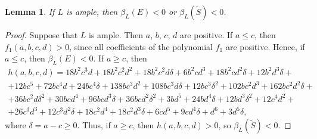 \documentclass[12pt]{amsart}
\newtheorem{lemma}[theorem]{Lemma}
\theoremstyle{definition}
\theoremstyle{remark}
\begin{document}
\begin{lemma}
\label{lemma:4-11}
If $L$ is ample, then $\beta_{L}(E)<0$ or $\beta_L(\widetilde{S})<0$.
\end{lemma}

\begin{proof}
Suppose that $L$ is ample. Then $a$, $b$, $c$, $d$ are positive.
If $a\leqslant c$, then $f_1(a,b,c,d)>0$, since all coefficients of the polynomial $f_1$ are positive.
Hence, if $a\leqslant c$, then $\beta_{L}(E)<0$. If $a\geqslant c$, then
\begin{multline*}
h(a,b,c,d)=18b^2c^3d+18b^2c^2d^2+18b^2c^2d\delta+6b^2cd^3+18b^2cd^2\delta+12b^2d^3\delta+\\
+12bc^5+72bc^4d+24bc^4\delta+138bc^3d^2+108bc^3d\delta+12bc^3\delta^2+102bc^2d^3+162bc^2d^2\delta+\\ +36bc^2d\delta^2+30bcd^4+96bcd^3\delta+36bcd^2\delta^2+3bd^5+24bd^4\delta+12bd^3\delta^2+12c^4d^2+\\
+26c^3d^3+12c^3d^2\delta+18c^2d^4+18c^2d^3\delta+6cd^5+9cd^4\delta+d^6+3d^5\delta,\quad \quad \quad \quad
\end{multline*}
where $\delta=a-c\geqslant 0$. Thus, if $a\geqslant c$, then $h(a,b,c,d)>0$, so $\beta_L(\widetilde{S})<0$.
\end{proof}
\end{document}
